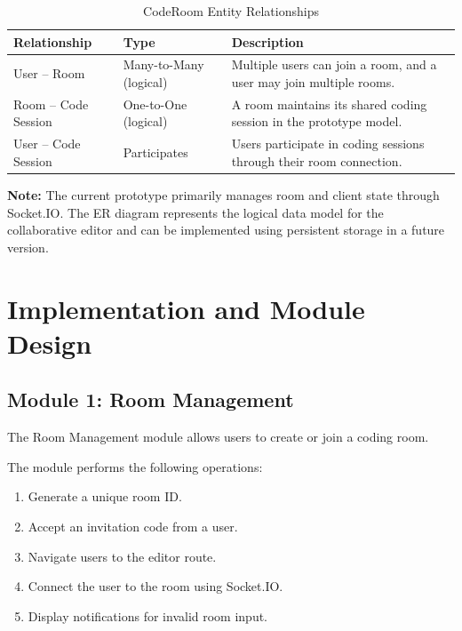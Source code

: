 \documentclass[12pt,a4paper,oneside]{report}
\begin{document}
\begin{table}[H]
\centering
\small
\begin{tabular}{p{3.5cm}p{3cm}p{5cm}}
\toprule
\textbf{Relationship} & \textbf{Type} & \textbf{Description}\\
\midrule
User -- Room & Many-to-Many (logical) &
Multiple users can join a room, and a user may join multiple rooms.\\
Room -- Code Session & One-to-One (logical) &
A room maintains its shared coding session in the prototype model.\\
User -- Code Session & Participates &
Users participate in coding sessions through their room connection.\\
\bottomrule
\end{tabular}
\caption{CodeRoom Entity Relationships}
\label{tab:relationships}
\end{table}

\textbf{Note:} The current prototype primarily manages room and client state through Socket.IO. The ER diagram represents the logical data model for the collaborative editor and can be implemented using persistent storage in a future version.

\chapter{Implementation and Module Design}

\section{Module 1: Room Management}

The Room Management module allows users to create or join a coding room.

The module performs the following operations:

\begin{enumerate}
    \item Generate a unique room ID.
    \item Accept an invitation code from a user.
    \item Navigate users to the editor route.
    \item Connect the user to the room using Socket.IO.
    \item Display notifications for invalid room input.
\end{enumerate}
\end{document}
